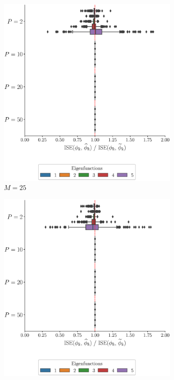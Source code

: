 \begin{results}

\begin{figure}
     \centering
     \begin{subfigure}[b]{0.49\textwidth}
         \centering
         \includegraphics[width=\textwidth]{figures/scenario_1/ise_N50_M25.eps}
         \caption{$M = 25$}
         \label{fig:ise_mfd_1d_25}
     \end{subfigure}
     \hfill
     \begin{subfigure}[b]{0.49\textwidth}
         \centering
         \includegraphics[width=\textwidth]{figures/scenario_1/ise_N50_M50.eps}

\end{subfigure}
\end{figure}
\end{results}
